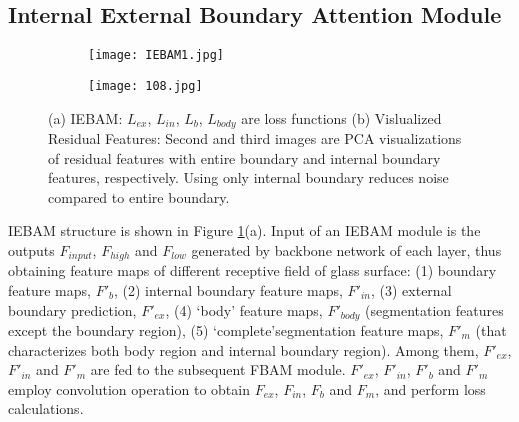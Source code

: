 \documentclass[10pt,twocolumn,letterpaper]{article}
\begin{document}
\subsection{Internal External Boundary Attention Module}
\begin{figure}[!h]
\centering
\begin{subfigure}[t]{1\linewidth}\texttt{[image: IEBAM1.jpg]}\end{subfigure}
\begin{subfigure}[t]{1\linewidth}\texttt{[image: 108.jpg]}\end{subfigure}\caption{(a) IEBAM: ${\textit{L}}_{ex}$, ${\textit{L}}_{in}$, ${\textit{L}}_{b}$, ${\textit{L}}_{body}$ are loss functions (b) Vislualized Residual Features: Second and third images are PCA visualizations of residual features with entire boundary and internal boundary features, respectively. Using only internal boundary reduces noise compared to entire boundary.}
\label{IEBAM}
\vspace*{-3mm}
\end{figure}
IEBAM structure is shown in Figure \ref{IEBAM}(a). Input of an IEBAM module is the outputs ${\textit{F}}_{input}$, ${\textit{F}}_{high}$ and ${\textit{F}}_{low}$ generated by backbone network of each layer, thus obtaining feature maps of different receptive field of glass surface: (1) boundary feature maps, ${\textit{F}{'}}_{b}$, (2) internal boundary feature maps, ${\textit{F}{'}}_{in}$, (3) external boundary prediction, ${\textit{F}{'}}_{ex}$, (4) ‘body’ feature maps, ${\textit{F}{'}}_{body}$ (segmentation features except the boundary region), (5) ‘complete’segmentation feature maps, ${\textit{F}{'}}_{m}$ (that characterizes both body region and internal boundary region). Among them, ${\textit{F}{'}}_{ex}$, ${\textit{F}{'}}_{in}$ and ${\textit{F}{'}}_{m}$ are fed to the subsequent FBAM module. ${\textit{F}{'}}_{ex}$, ${\textit{F}{'}}_{in}$, ${\textit{F}{'}}_{b}$ and  ${\textit{F}{'}}_{m}$ employ convolution operation to obtain ${\textit{F}}_{ex}$, ${\textit{F}}_{in}$, ${\textit{F}}_{b}$ and ${\textit{F}}_{m}$, and perform loss calculations.
\end{document}
